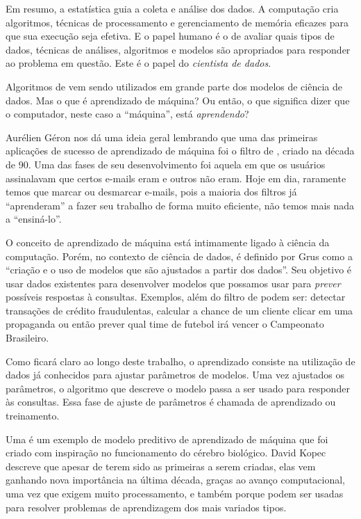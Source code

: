Em resumo, a estatística guia a coleta e análise dos dados. A computação cria algoritmos, técnicas de processamento e gerenciamento de memória eficazes para que sua execução seja efetiva. E o papel humano é o de avaliar quais tipos de dados, técnicas de análises, algoritmos e modelos são apropriados para responder ao problema em questão. Este é o papel do \emph{cientista de dados}.

Algoritmos de  vem sendo utilizados em grande parte dos modelos de ciência de dados. Mas o que é aprendizado de máquina? Ou então, o que significa dizer que o computador, neste caso a ``máquina'', está \emph{aprendendo}?

Aurélien Géron \citep{hands} nos dá uma ideia geral lembrando que uma das primeiras aplicações de sucesso de aprendizado de máquina foi o filtro de , criado na década de 90. Uma das fases de seu desenvolvimento foi aquela em que os usuários assinalavam que certos e-mails eram  e outros não eram. Hoje em dia, raramente temos que marcar ou desmarcar e-mails, pois a maioria dos filtros já ``aprenderam'' a fazer seu trabalho de forma muito eficiente, não temos mais nada a ``ensiná-lo''.

O conceito de aprendizado de máquina está intimamente ligado à ciência da computação. Porém, no contexto de ciência de dados, é definido por Grus \citep{data} como a ``criação e o uso de modelos que são ajustados a partir dos dados''. Seu objetivo é usar dados existentes para desenvolver modelos que possamos usar para \emph{prever} possíveis respostas à consultas. Exemplos, além do filtro de  podem ser: detectar transações de crédito fraudulentas, calcular a chance de um cliente clicar em uma propaganda ou então prever qual time de futebol irá vencer o Campeonato Brasileiro.

Como ficará claro ao longo deste trabalho, o aprendizado consiste na utilização de dados já conhecidos para ajustar parâmetros de modelos. Uma vez ajustados os parâmetros, o algoritmo que descreve o modelo passa a ser usado para responder às consultas. Essa fase de ajuste de parâmetros é chamada de aprendizado ou treinamento. 

Uma  é um exemplo de modelo preditivo de aprendizado de máquina que foi criado com inspiração no funcionamento do cérebro biológico. David Kopec \citep{classic} descreve que apesar de terem sido as primeiras a serem criadas, elas vem ganhando nova importância na última década, graças ao avanço computacional, uma vez que exigem muito processamento, e também porque podem ser usadas para resolver problemas de aprendizagem dos mais variados tipos.


